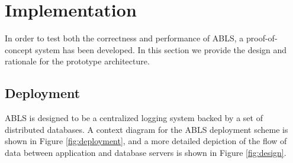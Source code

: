 \documentclass{sig-alternate}
\begin{document}

\section{Implementation}
In order to test both the correctness and performance of ABLS, a proof-of-concept system has been
developed. In this section we provide the design and rationale for the prototype architecture.

\subsection{Deployment}
\label{sec:deployment}
ABLS is designed to be a centralized logging system backed by a set of distributed databases. A context
diagram for the ABLS deployment scheme is shown in Figure \ref{fig:deployment}, and a more detailed
depiction of the flow of data between application and database servers is shown in Figure \ref{fig:design}.
\end{document}
